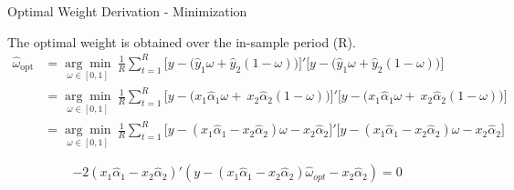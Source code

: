 \begin{frame}{Optimal Weight Derivation - Minimization}

The optimal weight is obtained over the in-sample period (R).
\vspace{-1mm}
\begin{align*}
\hat{\omega}_{\text{opt}} 
&= \underset{\omega \in [0,1]}{\arg\min} \ \frac{1}{R} \sum^R_{t=1} \Big[y - \big(\hat y_{1} \omega + \hat y_{2} (1-\omega)\big)\Big]' \Big[y - \big(\hat y_{1} \omega + \hat y_{2} (1-\omega)\big)\Big] \\
&= \underset{\omega \in [0,1]}{\arg\min} \ \frac{1}{R} \sum^R_{t=1} \Big[y - \big(x_1 \hat\alpha_1 \omega + \ x_2 \hat\alpha_2 (1-\omega)\big)\Big]'\Big[y - \big(x_1 \hat\alpha_1 \omega + \ x_2 \hat\alpha_2 (1-\omega)\big)\Big] \\
&= \underset{\omega \in [0,1]}{\arg\min} \ \frac{1}{R} \sum^R_{t=1} \big[y-(x_1 \hat\alpha_1 - x_2 \hat\alpha_2) \omega - x_2 \hat\alpha_2\big]'\big[y-(x_1 \hat\alpha_1 - x_2 \hat\alpha_2) \omega - x_2 \hat\alpha_2\big]
\end{align*}

 \[-2(x_1 \hat\alpha_1 - x_2 \hat\alpha_2)' (y-(x_1 \hat\alpha_1 - x_2 \hat\alpha_2) \hat\omega_{opt} - x_2 \hat\alpha_2) = 0\]

\end{frame}



